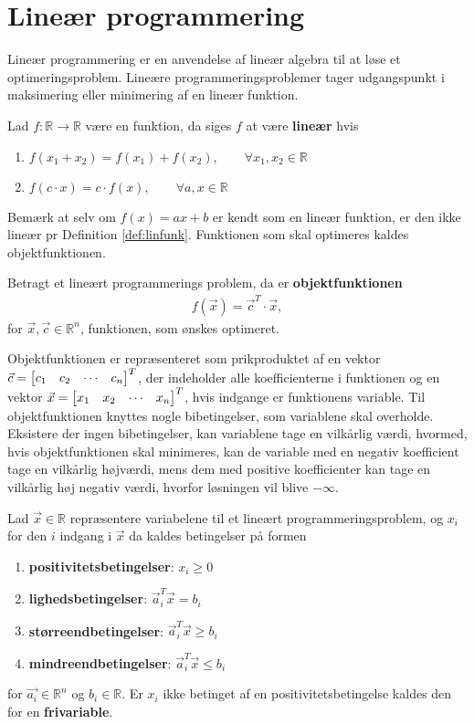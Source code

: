 \chapter{Lineær programmering}
Lineær programmering er en anvendelse af lineær algebra til at løse et optimeringsproblem. Lineære programmeringsproblemer tager udgangspunkt i maksimering eller minimering af en lineær funktion.
\begin{defn}
Lad $f:\mathds{R} \to \mathds{R}$ være en funktion, da siges $f$ at være \textbf{lineær} hvis
\begin{enumerate}[label=\alph*]
\item $f(x_1 + x_2) = f(x_1) + f(x_2), \qquad \forall x_1,x_2 \in \mathds{R}$
\item $f(c\cdot x) = c \cdot f(x), \qquad \forall a, x \in \mathds{R}$
\end{enumerate}
\label{def:linfunk}
\end{defn}
Bemærk at selv om $f(x) = ax + b$ er kendt som en lineær funktion, er den ikke lineær pr Definition \ref{def:linfunk}.
Funktionen som skal optimeres kaldes objektfunktionen.
\begin{defn}
Betragt et lineært programmerings problem, da er \textbf{objektfunktionen}
\begin{align*}
f(\vec{x}) = \vec{c}^T \cdot \vec{x}, 
\end{align*}
for $\vec{x}, \vec{c} \in \mathds{R}^n$, funktionen, som ønskes optimeret.
\end{defn}
Objektfunktionen er repræsenteret som prikproduktet af en vektor $\vec{c}= \begin{bmatrix} c_1 & c_2 & \cdots & c_n \end{bmatrix}^T$, der indeholder alle koefficienterne i funktionen og en vektor $\vec{x}= \begin{bmatrix} x_1 & x_2 & \cdots & x_n \end{bmatrix}^T$, hvis indgange er funktionens variable.
Til objektfunktionen knyttes nogle bibetingelser, som variablene skal overholde. 
Eksistere der ingen bibetingelser, kan variablene tage en vilkårlig værdi, hvormed, hvis objektfunktionen skal minimeres, kan de variable med en negativ koefficient tage en vilkårlig højværdi, mens dem med positive koefficienter kan tage en vilkårlig høj negativ værdi, hvorfor løsningen vil blive $- \infty$.
\begin{defn}[bibetingelser]
Lad $\vec{x}\in \mathds{R}$ repræsentere variabelene til et lineært programmeringsproblem, og $x_i$ for den $i$ indgang i $\vec{x}$ da kaldes betingelser på formen
\begin{enumerate}
\item \textbf{positivitetsbetingelser}: $x_i \geq 0$
\item \textbf{lighedsbetingelser}: $\vec{a}_i^T\vec{x} = b_i$
\item \textbf{størreendbetingelser}: $\vec{a}_i^T\vec{x} \geq b_i$
\item \textbf{mindreendbetingelser}: $\vec{a}_i^T\vec{x} \leq b_i$
\end{enumerate}
for $\vec{a_i}\in \mathds{R}^n$ og $b_i\in \mathds{R}$. 
Er $x_i$ ikke betinget af en positivitetsbetingelse kaldes den for en \textbf{frivariable}.
\end{defn}
